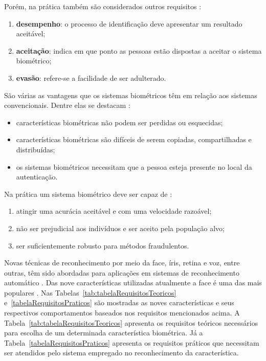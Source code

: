 	Porém, na prática também são considerados outros requisitos \cite{milene}:

	\begin{enumerate}
		\item \textbf{desempenho}: o processo de identificação deve apresentar um resultado aceitável;
		\item \textbf{aceitação}: indica em que ponto as pessoas estão dispostas a aceitar o sistema biométrico;
		\item \textbf{evasão}: refere-se a facilidade de ser adulterado.
	\end{enumerate}

	São várias as vantagens que os sistemas biométricos têm em relação aos sistemas
	convencionais. Dentre elas se destacam \cite{drovetto}:
		
	\begin{itemize}
		\item características biométricas não podem ser perdidas ou esquecidas;
		\item características biométricas são difíceis de serem copiadas, compartilhadas e distribuídas;
		\item os sistemas biométricos necessitam que a pessoa esteja presente no local
		da autenticação.
	\end{itemize}

	Na prática um sistema biométrico deve ser capaz de \cite{hong}:
		
	\begin{enumerate}
		\item atingir uma acurácia aceitável e com uma velocidade razoável;
		\item não ser prejudicial aos indivíduos e ser aceito pela população alvo;
		\item ser suficientemente robusto para métodos fraudulentos.
	\end{enumerate}

	Novas técnicas de reconhecimento por meio da face, íris, retina e voz, entre
	outras, têm sido abordadas para aplicações em sistemas de reconhecimento
	automático \cite{bolle,saocarlos}. Das nove características utilizadas
	atualmente a face é uma das mais populares \cite{milene}. Nas
	Tabelas~\ref{tab:tabelaRequisitosTeoricos} e~\ref{tabelaRequisitosPraticos} são
	mostradas as noves características e seus respectivos comportamentos baseados
	nos requisitos mencionados acima. A Tabela~\ref{tab:tabelaRequisitosTeoricos}
	apresenta os requisitos teóricos necessários para escolha de um determinada
	característica biométrica. Já a Tabela~\ref{tabelaRequisitosPraticos} apresenta
	os requisitos práticos que necessitam ser atendidos pelo sistema empregado no
	reconhecimento da característica.
		
